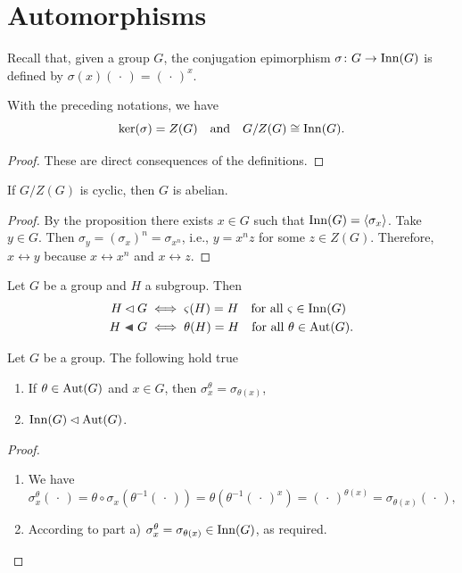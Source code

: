 \section{Automorphisms}

Recall that, given a group $G$, the conjugation epimorphism $\sigma\colon G\to{\rm Inn}(G)$ is defined by $\sigma(x)(\,\cdot\,)=(\,\cdot\,)^x$.

\begin{prop}
    With the preceding notations, we have
    $$
        \ker(\sigma)=Z(G)\quad\text{\upshape and}\quad G/Z(G)\cong{\rm Inn}(G).
    $$
\end{prop}

\begin{proof} These are direct consequences of the definitions.  \end{proof}

\begin{cor}
    If $G/Z(G)$ is cyclic, then $G$ is abelian.
\end{cor}

\begin{proof} By the proposition there exists $x\in G$ such that ${\rm Inn}(G)=\langle\sigma_x\rangle$. Take $y\in G$. Then $\sigma_y=(\sigma_x)^n=\sigma_{x^n}$, i.e., $y=x^nz$ for some $z\in Z(G)$. Therefore, $x\leftrightarrow y$ because $x\leftrightarrow x^n$ and $x\leftrightarrow z$.  \end{proof}

\begin{rem} Let $G$ be a group and $H$ a subgroup. Then
\begin{align*}
    H\normal G &\iff \varsigma(H)=H\quad\text{\upshape for all } \varsigma\in\Inn(G)\\
    H\ch G &\iff \theta(H)=H\quad\text{\upshape for all } \theta\in\Aut(G).
\end{align*}
\end{rem}

\begin{prop}\label{Inn-normal-in-Aut}
    Let\/ $G$ be a group. The following hold true
    \begin{enumerate}[\upshape a)]
        \item If\/ $\theta\in{\rm Aut}(G)$ and\/ $x\in G$, then\/ $\sigma_x^\theta=\sigma_{\theta(x)}$,
        \item ${\rm Inn}(G)\lhd{\rm Aut}(G)$.
    \end{enumerate}
\end{prop}

\begin{proof}${}$
\begin{enumerate}[\upshape a)]
    \item We have
    $$
        \sigma_x^\theta(\,\cdot\,) = \theta\circ\sigma_x(\theta^{-1}(\,\cdot\,))
            = \theta(\theta^{-1}(\,\cdot\,)^x) = (\,\cdot\,)^{\theta(x)}=\sigma_{\theta(x)}(\,\cdot\,),
    $$

    \item According to part a) $\sigma_x^\theta=\sigma_{\theta(x)}\in{\rm Inn}(G)$, as required.
\end{enumerate}
\end{proof}


